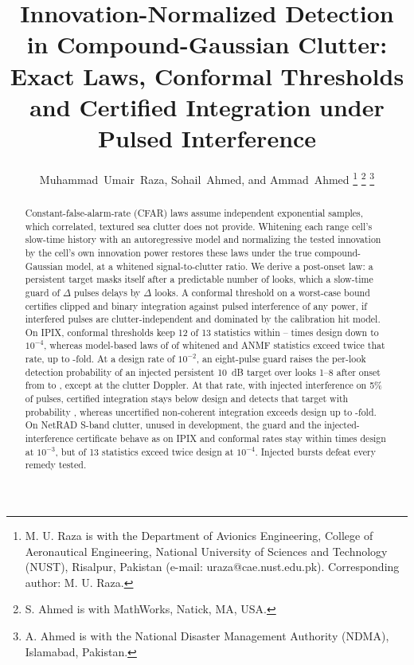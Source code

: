 \documentclass[journal]{IEEEtran}
\begin{document}
\title{Innovation-Normalized Detection in Compound-Gaussian Clutter: Exact Laws, Conformal Thresholds and Certified Integration under Pulsed Interference}

\author{Muhammad~Umair~Raza, Sohail~Ahmed, and Ammad~Ahmed%
\thanks{M. U. Raza is with the Department of Avionics Engineering, College of Aeronautical Engineering, National University of Sciences and Technology (NUST), Risalpur, Pakistan (e-mail: uraza@cae.nust.edu.pk). Corresponding author: M. U. Raza.}%
\thanks{S. Ahmed is with MathWorks, Natick, MA, USA.}%
\thanks{A. Ahmed is with the National Disaster Management Authority (NDMA), Islamabad, Pakistan.}}

\maketitle

\begin{abstract}
Constant-false-alarm-rate (CFAR) laws assume independent exponential samples, which correlated, textured sea clutter does not provide. Whitening each range cell's slow-time history with an autoregressive model and normalizing the tested innovation by the cell's own innovation power restores these laws under the true compound-Gaussian model, at a whitened signal-to-clutter ratio. We derive a post-onset law: a persistent target masks itself after a predictable number of looks, which a slow-time guard of $\Delta$ pulses delays by $\Delta$ looks. A conformal threshold on a worst-case bound certifies clipped and binary integration against pulsed interference of any power, if interfered pulses are clutter-independent and dominated by the calibration hit model. On IPIX, conformal thresholds keep 12 of 13 statistics within \LConfMinFour--\LConfMaxFour{} times design down to $10^{-4}$, whereas model-based laws of \NWhitenedLawsFail{} of \NWhitenedLaws{} whitened and ANMF statistics exceed twice that rate, up to \LAnalMaxFour-fold. At a design rate of $10^{-2}$, an eight-pulse guard raises the per-look detection probability of an injected persistent 10~dB target over looks 1--8 after onset from \GuardMeanLookZero{} to \GuardMeanLookEight, except at the clutter Doppler. At that rate, with injected interference on 5\% of pulses, certified integration stays below design and detects that target with probability \CertSixPdFive, whereas uncertified non-coherent integration exceeds design up to \IPfaMaxInt-fold. On NetRAD S-band clutter, unused in development, the guard and the injected-interference certificate behave as on IPIX and conformal rates stay within \NetConfMaxThree{} times design at $10^{-3}$, but \NetNOverTwoFour{} of 13 statistics exceed twice design at $10^{-4}$. Injected bursts defeat every remedy tested.
\end{abstract}
\end{document}
